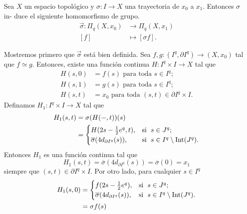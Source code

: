 \begin{prop}
    Sea $X$ un espacio topológico y $\sigma:I\to X$ una trayectoria de $x_0$ a $x_1$. Entonces $\sigma$ in- duce el siguiente homomorfismo de grupo. \begin{align*}
        \vec{\sigma}:\Pi_q(X,x_0)&\to \Pi_q(X,x_1)\\
        [f] &\mapsto [\sigma f].
    \end{align*}
\end{prop}
\begin{dem}
    Mostremos primero que $\vec{\sigma}$ está bien definida. Sea $f,g:(I^q,\partial I^q)\to (X,x_0)$ tal que $f\simeq g$. Entonces, existe una función continua $H:I^q\times I\to X$ tal que 
    \begin{align*}
        H(s,0)&=f(s) \text{ para toda } s\in I^q;\\
        H(s,1)&=g(s) \text{ para toda } s\in I^q;\\
        H(s,t)&=x_0 \text{ para toda } (s,t)\in \partial I^q\times I.
    \end{align*}
    Definamos $H_1:I^q\times I\to X$ tal que
    \begin{align*}
        H_1(s,t)&=\sigma (H(-,t))(s)\\
        &=
        \begin{cases}
         H(2s-\frac{1}{2}e^q,t), & \text{si \;} s\in J^q;\\
         \overline{\sigma}(4d_{\partial I^q}(s)), & \text{si \;} s\in I^q\setminus\mathrm{Int}(J^q).\\
        \end{cases}
    \end{align*}
    Entonces $H_1$ es una función continua tal que
    \begin{equation*}
        H_1(s,t)=\overline{\sigma}(4d_{\partial I^q}(s))=\overline{\sigma}(0)=x_1
    \end{equation*}
    siempre que $(s,t)\in \partial I^q\times I$. Por otro lado, para cualquier $s\in I^q$
    \begin{align*}
        H_1(s,0)&=\begin{cases}
         f(2s-\frac{1}{2}e^q), & \text{si \;} s\in J^q;\\
         \overline{\sigma}(4d_{\partial I^q}(s)), & \text{si \;} s\in I^q\setminus\mathrm{Int}(J^q).\\
        \end{cases}\\
        &=\sigma f(s)
    \end{align*}

\end{dem}
